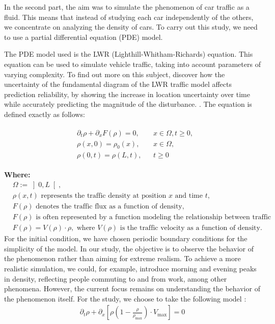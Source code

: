 \documentclass{article}
\begin{document}
			In the second part, the aim was to simulate the phenomenon of car traffic as a fluid. This means that instead of studying each car independently of the others, we concentrate on analyzing the density of cars. To carry out this study, we need to use a partial differential equation (PDE) model.
		
		The PDE model used is the LWR (Lighthill-Whitham-Richards) equation. This equation can be used to simulate vehicle traffic, taking into account parameters of varying complexity. To find out more on this subject, discover how the uncertainty of the fundamental diagram of the LWR traffic model affects prediction reliability, by showing the increase in location uncertainty over time while accurately predicting the magnitude of the disturbance. \cite{article}. The equation is defined exactly as follows:
		
		\begin{align*}\label{eq:PDE}
			\boxed{
				\begin{aligned}
					&\partial_t\rho + \partial_xF(\rho)=0, && x\in \Omega, t\ge 0,\\
					&\rho(x,0)=\rho_0(x), && x \in \Omega, \\
					&\rho(0,t)=\rho(L,t), && t\ge 0
			\end{aligned}}
		\end{align*}
		
		\textbf{Where:}
		\begin{align*}
			& \Omega := \left] 0,L\right[, \\
			& \rho(x,t) \text{ represents the traffic density at position } x \text{ and time } t, \\
			& F(\rho) \text{ denotes the traffic flux as a function of density,} \\
			& F(\rho) \text{ is often represented by a function modeling the relationship between traffic density and traffic velocity,} \\
			& F(\rho) = V(\rho) \cdot \rho, \text{ where } V(\rho) \text{ is the traffic velocity as a function of density}.
		\end{align*}
		\newline
		For the initial condition, we have chosen periodic boundary conditions for the simplicity of the model. In our study, the objective is to observe the behavior of the phenomenon rather than aiming for extreme realism. To achieve a more realistic simulation, we could, for example, introduce morning and evening peaks in density, reflecting people commuting to and from work, among other phenomena. However, the current focus remains on understanding the behavior of the phenomenon itself. \newline
		For the study, we choose to take the following model : 
		\begin{align}
			\boxed{\partial_t\rho + \partial_x\left[ \rho\left( 1-\frac{\rho}{\rho_{\text{max}}}\right) \cdot V_{\text{max}}\right] = 0 }
		\end{align}
	
\end{document}
